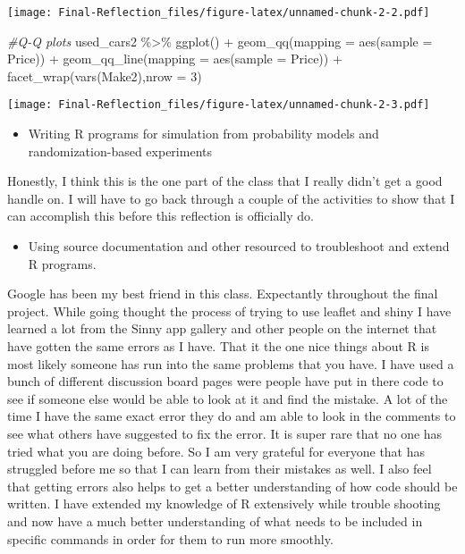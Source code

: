 \documentclass[
]{article}
\newenvironment{Shaded}{\begin{snugshade}}{\end{snugshade}}
\newcommand{\AttributeTok}[1]{\textcolor[rgb]{0.77,0.63,0.00}{#1}}
\newcommand{\CommentTok}[1]{\textcolor[rgb]{0.56,0.35,0.01}{\textit{#1}}}
\newcommand{\DecValTok}[1]{\textcolor[rgb]{0.00,0.00,0.81}{#1}}
\newcommand{\FunctionTok}[1]{\textcolor[rgb]{0.00,0.00,0.00}{#1}}
\newcommand{\NormalTok}[1]{#1}
\newcommand{\SpecialCharTok}[1]{\textcolor[rgb]{0.00,0.00,0.00}{#1}}
\providecommand{\tightlist}{%
  \setlength{\itemsep}{0pt}\setlength{\parskip}{0pt}}
\begin{document}
\texttt{[image: Final-Reflection\_files/figure-latex/unnamed-chunk-2-2.pdf]}

\begin{Shaded}
\begin{Highlighting}[]
\CommentTok{\#Q{-}Q plots }
\NormalTok{used\_cars2 }\SpecialCharTok{\%\textgreater{}\%} 
  \FunctionTok{ggplot}\NormalTok{() }\SpecialCharTok{+}
  \FunctionTok{geom\_qq}\NormalTok{(}\AttributeTok{mapping =} \FunctionTok{aes}\NormalTok{(}\AttributeTok{sample =}\NormalTok{ Price)) }\SpecialCharTok{+}
  \FunctionTok{geom\_qq\_line}\NormalTok{(}\AttributeTok{mapping =} \FunctionTok{aes}\NormalTok{(}\AttributeTok{sample =}\NormalTok{ Price)) }\SpecialCharTok{+}
  \FunctionTok{facet\_wrap}\NormalTok{(}\FunctionTok{vars}\NormalTok{(Make2),}\AttributeTok{nrow =} \DecValTok{3}\NormalTok{)}
\end{Highlighting}
\end{Shaded}

\texttt{[image: Final-Reflection\_files/figure-latex/unnamed-chunk-2-3.pdf]}

\begin{itemize}
\tightlist
\item
  Writing R programs for simulation from probability models and
  randomization-based experiments
\end{itemize}

Honestly, I think this is the one part of the class that I really didn't
get a good handle on. I will have to go back through a couple of the
activities to show that I can accomplish this before this reflection is
officially do.

\begin{itemize}
\tightlist
\item
  Using source documentation and other resourced to troubleshoot and
  extend R programs.
\end{itemize}

Google has been my best friend in this class. Expectantly throughout the
final project. While going thought the process of trying to use leaflet
and shiny I have learned a lot from the Sinny app gallery and other
people on the internet that have gotten the same errors as I have. That
it the one nice things about R is most likely someone has run into the
same problems that you have. I have used a bunch of different discussion
board pages were people have put in there code to see if someone else
would be able to look at it and find the mistake. A lot of the time I
have the same exact error they do and am able to look in the comments to
see what others have suggested to fix the error. It is super rare that
no one has tried what you are doing before. So I am very grateful for
everyone that has struggled before me so that I can learn from their
mistakes as well. I also feel that getting errors also helps to get a
better understanding of how code should be written. I have extended my
knowledge of R extensively while trouble shooting and now have a much
better understanding of what needs to be included in specific commands
in order for them to run more smoothly.
\end{document}
